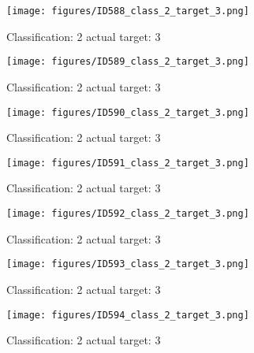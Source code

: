\begin{figure}[h!]
\begin{center}
\texttt{[image: figures/ID588\_class\_2\_target\_3.png]}
\end{center}
\caption{ Classification: 2 actual target: 3}
\label{fig:ID588_class_2_target_3}
\end{figure}
\begin{figure}[h!]
\begin{center}
\texttt{[image: figures/ID589\_class\_2\_target\_3.png]}
\end{center}
\caption{ Classification: 2 actual target: 3}
\label{fig:ID589_class_2_target_3}
\end{figure}
\begin{figure}[h!]
\begin{center}
\texttt{[image: figures/ID590\_class\_2\_target\_3.png]}
\end{center}
\caption{ Classification: 2 actual target: 3}
\label{fig:ID590_class_2_target_3}
\end{figure}
\begin{figure}[h!]
\begin{center}
\texttt{[image: figures/ID591\_class\_2\_target\_3.png]}
\end{center}
\caption{ Classification: 2 actual target: 3}
\label{fig:ID591_class_2_target_3}
\end{figure}
\begin{figure}[h!]
\begin{center}
\texttt{[image: figures/ID592\_class\_2\_target\_3.png]}
\end{center}
\caption{ Classification: 2 actual target: 3}
\label{fig:ID592_class_2_target_3}
\end{figure}
\begin{figure}[h!]
\begin{center}
\texttt{[image: figures/ID593\_class\_2\_target\_3.png]}
\end{center}
\caption{ Classification: 2 actual target: 3}
\label{fig:ID593_class_2_target_3}
\end{figure}
\begin{figure}[h!]
\begin{center}
\texttt{[image: figures/ID594\_class\_2\_target\_3.png]}
\end{center}
\caption{ Classification: 2 actual target: 3}
\label{fig:ID594_class_2_target_3}
\end{figure}
